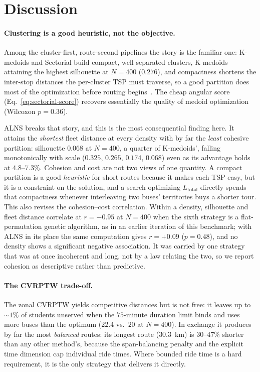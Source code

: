 \documentclass[graybox]{SNmult}
\begin{document}
\section{Discussion}\label{sec:discussion}
\paragraph{Clustering is a good heuristic, not the objective.}
Among the cluster-first, route-second pipelines the story is the familiar
one: K-medoids and Sectorial build compact, well-separated clusters,
K-medoids attaining the highest silhouette at $N=400$ ($0.276$), and
compactness shortens the inter-stop distances the per-cluster TSP must
traverse, so a good partition does most of the optimization before routing
begins~\cite{CakirRevisitingProblem,Comert2018AStudy}. The cheap angular
score (Eq.~\ref{eq:sectorial-score}) recovers essentially the quality of
medoid optimization (Wilcoxon $p=0.36$).

ALNS breaks that story, and this is the most consequential finding here.
It attains the \emph{shortest} fleet distance at every density with by far
the \emph{least} cohesive partition: silhouette $0.068$ at $N=400$, a
quarter of K-medoids', falling monotonically with scale ($0.325$, $0.265$,
$0.174$, $0.068$) even as its advantage holds at $4.8$--$7.3\%$. Cohesion
and cost are not two views of one quantity. A compact partition is a good
\emph{heuristic} for short routes because it makes each TSP easy, but it
is a constraint on the solution, and a search optimizing
$L_{\mathrm{total}}$ directly spends that compactness whenever
interleaving two buses' territories buys a shorter tour. This also revises
the cohesion--cost correlation. Within a density, silhouette and fleet
distance correlate at $r=-0.95$ at $N{=}400$ when the sixth strategy is a
flat-permutation genetic algorithm, as in an earlier iteration of this
benchmark; with ALNS in its place the same computation gives $r=+0.09$
($p=0.48$), and no density shows a significant negative association. It
was carried by one strategy that was at once incoherent and long, not by a
law relating the two, so we report cohesion as descriptive rather than
predictive.

\paragraph{The CVRPTW trade-off.}
The zonal CVRPTW yields competitive distances but is not free: it leaves
up to ${\sim}1\%$ of students unserved when the $75$-minute duration limit
binds and uses more buses than the optimum ($22.4$ vs.\ $20$ at $N=400$).
In exchange it produces by far the most \emph{balanced} routes: its
longest route ($30.3$~km) is $30$--$47\%$ shorter than any other
method's, because the span-balancing penalty and
the explicit time dimension cap individual ride times. Where bounded ride
time is a hard requirement, it is the only strategy that delivers it
directly.
\end{document}
